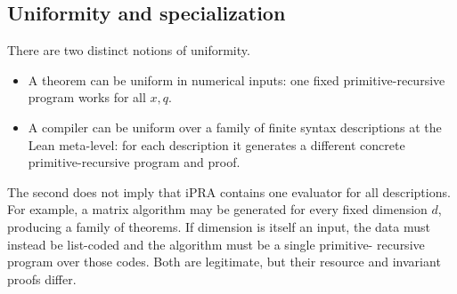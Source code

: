 \subsection{Uniformity and specialization}

There are two distinct notions of uniformity.

\begin{itemize}
  \item A theorem can be uniform in numerical inputs: one fixed primitive-recursive program works for all
        \(x,q\).
  \item A compiler can be uniform over a family of finite syntax descriptions at the Lean meta-level: for
        each description it generates a different concrete primitive-recursive program and proof.
\end{itemize}
The second does not imply that iPRA contains one evaluator for all descriptions.  For example, a matrix
algorithm may be generated for every fixed dimension \(d\), producing a family of theorems.  If dimension
is itself an input, the data must instead be list-coded and the algorithm must be a single primitive-
recursive program over those codes.  Both are legitimate, but their resource and invariant proofs differ.
